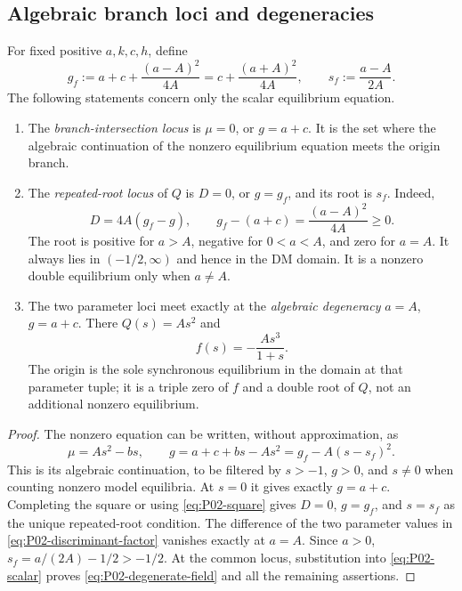 \subsection{Algebraic branch loci and degeneracies}

\begin{proposition}
\label{prop:P02-loci}
For fixed positive $a,k,c,h$, define
\begin{equation}
\label{eq:P02-gf}
 g_f:=a+c+\frac{(a-A)^2}{4A}
      =c+\frac{(a+A)^2}{4A},\qquad
 s_f:=\frac{a-A}{2A}.
\end{equation}
The following statements concern only the scalar equilibrium equation.
\begin{enumerate}[label=(\roman*),leftmargin=*]
\item The \emph{branch-intersection locus} is $\mu=0$, or $g=a+c$.
It is the set where the algebraic continuation of the nonzero
equilibrium equation meets the origin branch.
\item The \emph{repeated-root locus} of $Q$ is $D=0$, or $g=g_f$,
and its root is $s_f$. Indeed,
\begin{equation}
\label{eq:P02-discriminant-factor}
 D=4A(g_f-g),\qquad
 g_f-(a+c)=\frac{(a-A)^2}{4A}\ge0.
\end{equation}
The root is positive for $a>A$, negative for $0<a<A$, and zero
for $a=A$. It always lies in $(-1/2,\infty)$ and hence in the
DM domain. It is a nonzero double equilibrium only when $a\ne A$.
\item The two parameter loci meet exactly at the \emph{algebraic
degeneracy} $a=A$, $g=a+c$. There $Q(s)=As^2$ and
\begin{equation}
\label{eq:P02-degenerate-field}
 f(s)=-\frac{As^3}{1+s}.
\end{equation}
The origin is the sole synchronous equilibrium in the domain at
that parameter tuple; it is a triple zero of $f$ and a double root
of $Q$, not an additional nonzero equilibrium.
\end{enumerate}
\end{proposition}

\begin{proof}
The nonzero equation can be written, without approximation, as
\begin{equation}
\label{eq:P02-branch-graph}
 \mu=As^2-bs,\qquad
 g=a+c+bs-As^2
   =g_f-A(s-s_f)^2.
\end{equation}
This is its algebraic continuation, to be filtered by $s>-1$,
$g>0$, and $s\ne0$ when counting nonzero model equilibria.
At $s=0$ it gives exactly $g=a+c$. Completing the square or using
\eqref{eq:P02-square} gives $D=0$, $g=g_f$, and $s=s_f$ as the
unique repeated-root condition. The difference of the two parameter
values in \eqref{eq:P02-discriminant-factor} vanishes exactly at
$a=A$. Since $a>0$, $s_f=a/(2A)-1/2>-1/2$. At the common
locus, substitution into \eqref{eq:P02-scalar} proves
\eqref{eq:P02-degenerate-field} and all the remaining assertions.
\end{proof}


